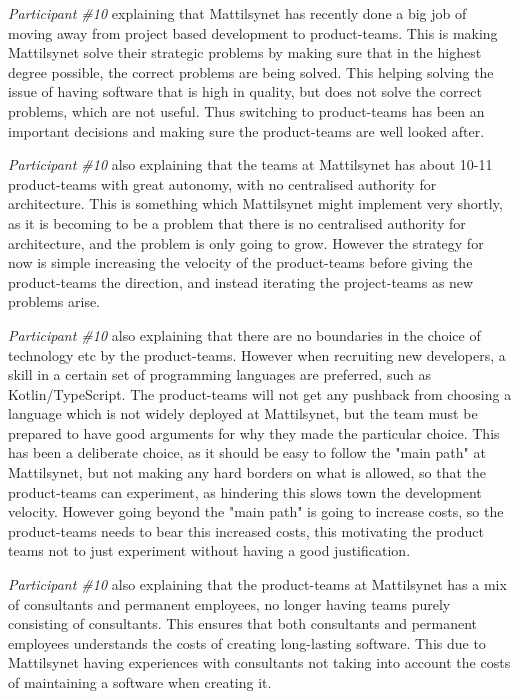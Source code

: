 \textit{Participant \#10} explaining that Mattilsynet has recently done a big job of moving away from project based development to product-teams. This is making Mattilsynet solve their strategic problems by making sure that in the highest degree possible, the correct problems are being solved. This helping solving the issue of having software that is high in quality, but does not solve the correct problems, which are not useful. Thus switching to product-teams has been an important decisions and making sure the product-teams are well looked after.

\textit{Participant \#10} also explaining that the teams at Mattilsynet has about 10-11 product-teams with great autonomy, with no centralised authority for architecture. This is something which Mattilsynet might implement very shortly, as it is becoming to be a problem that there is no centralised authority for architecture, and the problem is only going to grow. However the strategy for now is simple increasing the velocity of the product-teams before giving the product-teams the direction, and instead iterating the project-teams as new problems arise.

\textit{Participant \#10} also explaining that there are no boundaries in the choice of technology etc by the product-teams. However when recruiting new developers, a skill in a certain set of programming languages are preferred, such as Kotlin/TypeScript. The product-teams will not get any pushback from choosing a language which is not widely deployed at Mattilsynet, but the team must be prepared to have good arguments for why they made the particular choice. This has been a deliberate choice, as it should be easy to follow the "main path" at Mattilsynet, but not making any hard borders on what is allowed, so that the product-teams can experiment, as hindering this slows town the development velocity. However going beyond the "main path" is going to increase costs, so the product-teams needs to bear this increased costs, this motivating the product teams not to just experiment without having a good justification.

\textit{Participant \#10} also explaining that the product-teams at Mattilsynet has a mix of consultants and permanent employees, no longer having teams purely consisting of consultants. This ensures that both consultants and permanent employees understands the costs of creating long-lasting software. This due to Mattilsynet having experiences with consultants not taking into account the costs of maintaining a software when creating it.

